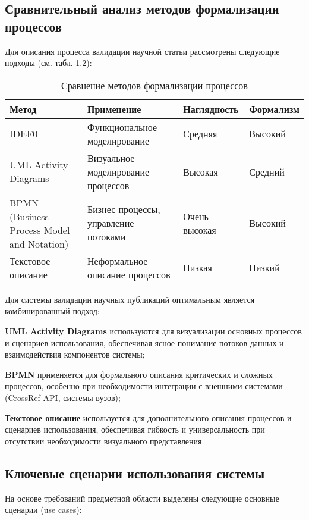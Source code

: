 \subsection{Сравнительный анализ методов формализации процессов}
Для описания процесса валидации научной статьи рассмотрены следующие подходы (см. табл. 1.2):

\begin{table}[h]
	\caption{Сравнение методов формализации процессов}
	\label{tab:process-formalization-methods}
	\centering
	\begin{tabular}{|p{}|p{}|p{}|p{}|}
		\hline
		Метод & Применение & Наглядность & Формализм \\
		\hline
		IDEF0 & Функциональное моделирование & Средняя & Высокий \\
		\hline
		UML Activity Diagrams & Визуальное моделирование процессов & Высокая & Средний \\
		\hline
		BPMN (Business Process Model and Notation) & Бизнес-процессы, управление потоками & Очень высокая & Высокий \\
		\hline
		Текстовое описание & Неформальное описание процессов & Низкая & Низкий \\
		\hline
	\end{tabular}
\end{table}

Для системы валидации научных публикаций оптимальным является комбинированный подход:

\begin{compactenum}
	\item \textbf{UML Activity Diagrams} используются для визуализации основных процессов 
	и сценариев использования, обеспечивая ясное понимание потоков данных и взаимодействия
	компонентов системы;
	\item \textbf{BPMN} применяется для формального описания критических и сложных процессов,
	особенно при необходимости интеграции с внешними системами (CrossRef API, системы вузов);
	\item \textbf{Текстовое описание} используется для дополнительного описания процессов и сценариев использования,
	обеспечивая гибкость и универсальность при отсутствии необходимости визуального представления.
\end{compactenum}

\subsection{Ключевые сценарии использования системы}
На основе требований предметной области выделены следующие основные сценарии (use cases):



